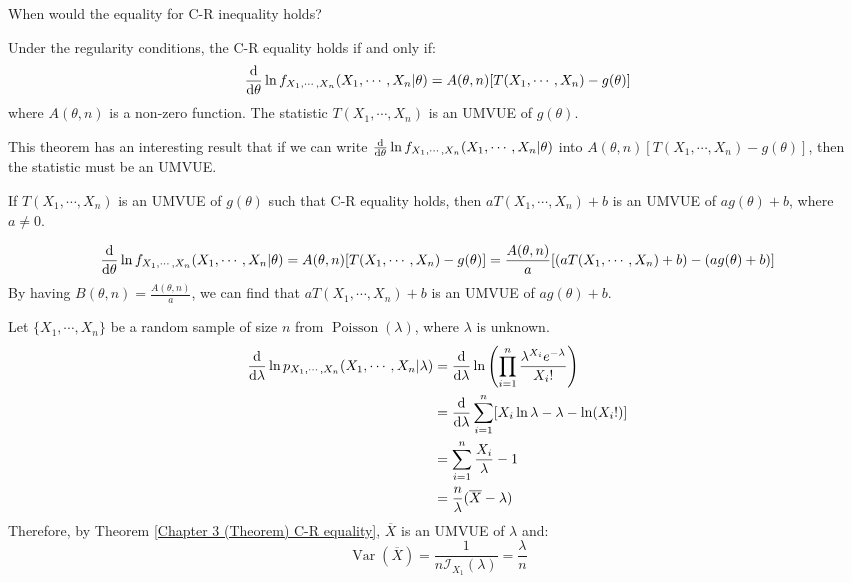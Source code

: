 \documentclass{huhtakm-template-book-v2}
\DeclareMathOperator{\Var}{Var}
\DeclareMathOperator{\Poisson}{Poisson}
\begin{document}
\newpage
When would the equality for C-R inequality holds?
\begin{thm}
	\label{Chapter 3 (Theorem) C-R equality}
	Under the regularity conditions, the C-R equality holds if and only if:
	\begin{equation*}
		\odv*{\ln{f_{X_{1},\cdots,X_{n}}(X_{1},\cdots,X_{n}|\theta)}}{\theta}=A(\theta,n)[T(X_{1},\cdots,X_{n})-g(\theta)]
	\end{equation*}
	where $A(\theta,n)$ is a non-zero function. The statistic $T(X_{1},\cdots,X_{n})$ is an UMVUE of $g(\theta)$. 
\end{thm}
This theorem has an interesting result that if we can write $\odv*{\ln{f_{X_{1},\cdots,X_{n}}(X_{1},\cdots,X_{n}|\theta)}}{\theta}$ into $A(\theta,n)[T(X_{1},\cdots,X_{n})-g(\theta)]$, then the statistic must be an UMVUE.
\begin{lem}
	If $T(X_{1},\cdots,X_{n})$ is an UMVUE of $g(\theta)$ such that C-R equality holds, then $aT(X_{1},\cdots,X_{n})+b$ is an UMVUE of $ag(\theta)+b$, where $a\neq 0$.
\end{lem}
\begin{proofing}
	\begin{equation*}
		\odv*{\ln{f_{X_{1},\cdots,X_{n}}(X_{1},\cdots,X_{n}|\theta)}}{\theta}=A(\theta,n)[T(X_{1},\cdots,X_{n})-g(\theta)]=\frac{A(\theta,n)}{a}[(aT(X_{1},\cdots,X_{n})+b)-(ag(\theta)+b)]
	\end{equation*}
	By having $B(\theta,n)=\frac{A(\theta,n)}{a}$, we can find that $aT(X_{1},\cdots,X_{n})+b$ is an UMVUE of $ag(\theta)+b$.
\end{proofing}
\begin{eg}
	Let $\{X_{1},\cdots,X_{n}\}$ be a random sample of size $n$ from $\Poisson(\lambda)$, where $\lambda$ is unknown.
	\begin{align*}
		\odv*{\ln{p_{X_{1},\cdots,X_{n}}(X_{1},\cdots,X_{n}|\lambda)}}{\lambda}&=\odv*{\ln\left(\prod_{i=1}^{n}\frac{\lambda^{X_{i}}e^{-\lambda}}{X_{i}!}\right)}{\lambda}\\
		&=\odv*{\sum_{i=1}^{n}[X_{i}\ln{\lambda}-\lambda-\ln(X_{i}!)]}{\lambda}\\
		&=\sum_{i=1}^{n}\frac{X_{i}}{\lambda}-1\\
		&=\frac{n}{\lambda}(\overline{X}-\lambda)
	\end{align*}
	Therefore, by Theorem \ref{Chapter 3 (Theorem) C-R equality}, $\overline{X}$ is an UMVUE of $\lambda$ and:
	\begin{equation*}
		\Var(\overline{X})=\frac{1}{n\mathcal{I}_{X_{1}}(\lambda)}=\frac{\lambda}{n}
	\end{equation*}
\end{eg}
\end{document}

